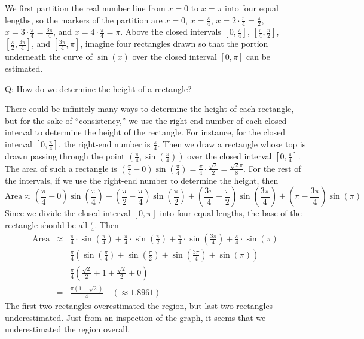 \documentclass[12pt]{article}
\begin{document}
We first partition the real number line from $x = 0$ to $x = \pi$ into
four equal lengths, so the markers of the partition are
$x = 0$, $x = \frac{\pi}{4}$, $x = 2 \cdot \frac{\pi}{4} = \frac{\pi}{2}$,
$x = 3 \cdot \frac{\pi}{4} = \frac{3\pi}{4}$, and $x = 4\cdot \frac{\pi}{4} = \pi$. Above the closed intervals $[0, \frac{\pi}{4}]$, $[\frac{\pi}{4}, \frac{\pi}{2}]$, $[\frac{\pi}{2}, \frac{3\pi}{4}]$, and $[\frac{3\pi}{4}, \pi]$, imagine four rectangles drawn so that the portion underneath the curve of $\sin(x)$ over the closed interval $[0, \pi]$ can be estimated.

Q: How do we determine the height of a rectangle?

There could be infinitely many ways to determine the height of each rectangle, but for the sake of ``consistency,'' we use the right-end number of each closed interval to determine the height of the rectangle. For instance, for the closed interval $[0, \frac{\pi}{4}]$, the right-end number is $\frac{\pi}{4}$. Then we draw a rectangle whose top is drawn passing through the point $(\frac{\pi}{4}, \sin(\frac{\pi}{4}))$ over the closed interval $[0, \frac{\pi}{4}]$. The area of such a rectangle is $(\frac{\pi}{4} - 0)\sin(\frac{\pi}{4}) = \frac{\pi}{4} \cdot \frac{\sqrt{2}}{2} = \frac{\sqrt{2}\pi}{8}$. For the rest of the intervals, if we use the right-end number to determine the height, then 
$$ \text{Area} \approx \left(\frac{\pi}{4} - 0\right)\sin\left(\frac{\pi}{4}\right)
+ \left(\frac{\pi}{2} - \frac{\pi}{4}\right)\sin\left(\frac{\pi}{2}\right)
+ \left(\frac{3\pi}{4} - \frac{\pi}{2}\right)\sin\left(\frac{3\pi}{4}\right)
+ \left(\pi - \frac{3\pi}{4}\right)\sin\left(\pi\right) $$
Since we divide the closed interval $[0,\pi]$ into four equal lengths, the
base of the rectangle should be all $\frac{\pi}{4}$. Then
\begin{eqnarray*}
\text{Area} &\approx & \frac{\pi}{4} \cdot \sin\left(\frac{\pi}{4}\right)
+ \frac{\pi}{4} \cdot \sin\left(\frac{\pi}{2}\right)
+ \frac{\pi}{4} \cdot \sin\left(\frac{3\pi}{4}\right)
+ \frac{\pi}{4} \cdot \sin\left(\pi\right)  \\
&=& \frac{\pi}{4}\left(\sin\left(\frac{\pi}{4}\right) + \sin\left(\frac{\pi}{2}\right) + \sin\left(\frac{3\pi}{4}\right) + \sin\left(\pi\right)\right)  \\
&=& \frac{\pi}{4}\left(\frac{\sqrt{2}}{2} + 1 + \frac{\sqrt{2}}{2} + 0 \right)  \\ &=& \frac{\pi(1 + \sqrt{2})}{4} \quad (\approx 1.8961)
\end{eqnarray*}
The first two rectangles overestimated the region, but last two rectangles underestimated. Just from an inspection of the graph, it seems that we underestimated the region overall. 
\end{document}
